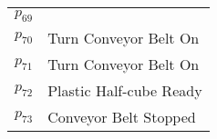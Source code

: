 \begin{table}[H]
\begin{tabular}{M{5cm}M{10cm}}
\hyperlink{partialNet:p69}{\hypertarget{partialTable:p69}{$p_{69}$}} & \\
\hyperlink{partialNet:p70}{\hypertarget{partialTable:p70}{$p_{70}$}} & Turn Conveyor Belt On\\
\hyperlink{partialNet:p71}{\hypertarget{partialTable:p71}{$p_{71}$}} & Turn Conveyor Belt On\\
\hyperlink{partialNet:p72}{\hypertarget{partialTable:p72}{$p_{72}$}} & Plastic Half-cube Ready\\
\hyperlink{partialNet:p73}{\hypertarget{partialTable:p73}{$p_{73}$}} & Conveyor Belt Stopped\\
\end{tabular}
\end{table}
